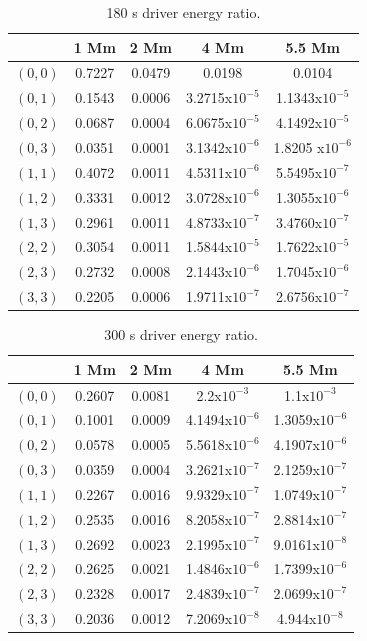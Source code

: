\documentclass[preprint,authoryear,12pt]{elsarticle}
\begin{document}
\begin{table}[h]
\centering
\begin{tabular}{c c c c c }
\hline
   &  1 Mm & 2 Mm & 4 Mm & 5.5 Mm \\
\hline
$(0, 0)$ &  0.7227 & 0.0479 & 0.0198 & 0.0104 \\
\hline
$(0, 1)$ & 0.1543 & 0.0006 & 3.2715x$10^{-5}$ &  1.1343x$10^{-5}$\\
\hline
$(0, 2)$ & 0.0687 & 0.0004 & 6.0675x$10^{-5}$ &  4.1492x$10^{-5}$\\
\hline
$(0, 3)$ & 0.0351 & 0.0001 & 3.1342x$10^{-6}$ & 1.8205 x$10^{-6}$\\
\hline
$(1, 1)$ & 0.4072 & 0.0011 & 4.5311x$10^{-6}$ &  5.5495x$10^{-7}$\\
\hline
$(1, 2)$ & 0.3331 & 0.0012 & 3.0728x$10^{-6}$ &  1.3055x$10^{-6}$\\
\hline
$(1, 3)$ & 0.2961 & 0.0011 & 4.8733x$10^{-7}$ &  3.4760x$10^{-7}$\\
\hline
$(2, 2)$ & 0.3054 & 0.0011 & 1.5844x$10^{-5}$ &  1.7622x$10^{-5}$\\
\hline
$(2, 3)$ & 0.2732 & 0.0008 & 2.1443x$10^{-6}$ &  1.7045x$10^{-6}$\\
\hline
$(3, 3)$ & 0.2205 & 0.0006 & 1.9711x$10^{-7}$ &  2.6756x$10^{-7}$\\
\hline
\end{tabular} 
\caption{180 s driver energy ratio.}
\label{Table180mode}
\end{table}

\begin{table}[h]
\centering
\begin{tabular}{c c c c c }
\hline
   &  1 Mm & 2 Mm & 4 Mm & 5.5 Mm \\
\hline
$(0, 0)$ &  0.2607 & 0.0081 & 2.2x$10^{-3}$ &  1.1x$10^{-3}$\\
\hline
$(0, 1)$ & 0.1001 & 0.0009 & 4.1494x$10^{-6}$ &  1.3059x$10^{-6}$\\
\hline
$(0, 2)$ & 0.0578 & 0.0005 & 5.5618x$10^{-6}$ &  4.1907x$10^{-6}$\\
\hline
$(0, 3)$ & 0.0359 & 0.0004 &3.2621x$10^{-7}$ &  2.1259x$10^{-7}$\\
\hline
$(1, 1)$ & 0.2267 & 0.0016 & 9.9329x$10^{-7}$ &  1.0749x$10^{-7}$\\
\hline
$(1, 2)$ & 0.2535 & 0.0016 & 8.2058x$10^{-7}$ &  2.8814x$10^{-7}$\\
\hline
$(1, 3)$ & 0.2692 & 0.0023 & 2.1995x$10^{-7}$ &  9.0161x$10^{-8}$\\
\hline
$(2, 2)$ & 0.2625 & 0.0021 & 1.4846x$10^{-6}$ &  1.7399x$10^{-6}$\\
\hline
$(2, 3)$ & 0.2328 & 0.0017 & 2.4839x$10^{-7}$ &  2.0699x$10^{-7}$\\
\hline
$(3, 3)$ & 0.2036 & 0.0012 & 7.2069x$10^{-8}$ &  4.944x$10^{-8}$\\
\hline
\end{tabular} 
\caption{300 s driver energy ratio.}
\label{Table300mode}
\end{table}
\end{document}
